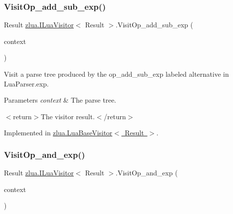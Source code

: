 \subsubsection{\texorpdfstring{Visit\+Op\+\_\+add\+\_\+sub\+\_\+exp()}{VisitOp\_add\_sub\_exp()}}
{\footnotesize\ttfamily Result \mbox{\hyperlink{interfacezlua_1_1_i_lua_visitor}{zlua.\+I\+Lua\+Visitor}}$<$ Result $>$.Visit\+Op\+\_\+add\+\_\+sub\+\_\+exp (\begin{DoxyParamCaption}\item[{\mbox{[}\+Not\+Null\mbox{]} \mbox{\hyperlink{classzlua_1_1_lua_parser_1_1_op__add__sub__exp_context}{Lua\+Parser.\+Op\+\_\+add\+\_\+sub\+\_\+exp\+Context}}}]{context }\end{DoxyParamCaption})}



Visit a parse tree produced by the {\ttfamily op\+\_\+add\+\_\+sub\+\_\+exp} labeled alternative in Lua\+Parser.\+exp. 


\begin{DoxyParams}{Parameters}
{\em context} & The parse tree.\\
\hline
\end{DoxyParams}
$<$return$>$The visitor result.$<$/return$>$ 

Implemented in \mbox{\hyperlink{classzlua_1_1_lua_base_visitor_aa4492d5f54ee93070caba1efbcdcf7f2}{zlua.\+Lua\+Base\+Visitor$<$ Result $>$}}.

\mbox{\label{interfacezlua_1_1_i_lua_visitor_a08fb69b4fbc6ffe769818deeb1891307}} 
\subsubsection{\texorpdfstring{Visit\+Op\+\_\+and\+\_\+exp()}{VisitOp\_and\_exp()}}
{\footnotesize\ttfamily Result \mbox{\hyperlink{interfacezlua_1_1_i_lua_visitor}{zlua.\+I\+Lua\+Visitor}}$<$ Result $>$.Visit\+Op\+\_\+and\+\_\+exp (\begin{DoxyParamCaption}\item[{\mbox{[}\+Not\+Null\mbox{]} \mbox{\hyperlink{classzlua_1_1_lua_parser_1_1_op__and__exp_context}{Lua\+Parser.\+Op\+\_\+and\+\_\+exp\+Context}}}]{context }\end{DoxyParamCaption})}



